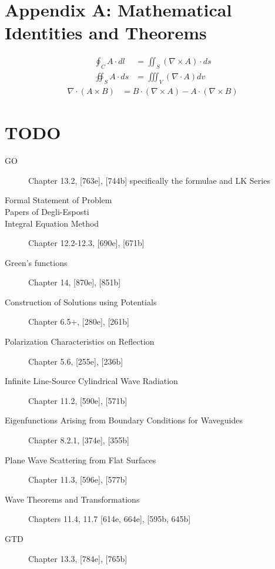 \documentclass{article}
\numberwithin{equation}{section}
\begin{document}
    \section*{Appendix A: Mathematical Identities and Theorems}
        \begin{subequations} \label{eq:integralVectorTheorems}
            \begin{align}
                \oint_C A \cdot dl &= \iint_S (\nabla \times A) \cdot ds
                    \label{eq:stokes} \\
                \oiint_S A \cdot ds &= \iiint_V (\nabla \cdot A) dv \label{eq:divergence}
            \end{align}
        \end{subequations}
        \begin{subequations} \label{eq:vectorDifferentialIdentities}
            \begin{align}
                \nabla \cdot (A \times B) &= B \cdot (\nabla \times A) - A \cdot (\nabla
                    \times B) \label{eq:divOfCurlOfProduct}
            \end{align}
        \end{subequations}
    \section*{TODO}
        \begin{description}
            \item[GO] Chapter 13.2, [763e], [744b] specifically the formulae and LK Series
            \item[Formal Statement of Problem]
            \item[Papers of Degli-Esposti]
            \item[Integral Equation Method] Chapter 12.2-12.3, [690e], [671b]
            \item[Green's functions] Chapter 14, [870e], [851b]
            \item[Construction of Solutions using Potentials] Chapter 6.5+, [280e], [261b] 
            \item[Polarization Characteristics on Reflection] Chapter 5.6, [255e], [236b] 
            \item[Infinite Line-Source Cylindrical Wave Radiation] Chapter 11.2, [590e],
                [571b] 
            \item[Eigenfunctions Arising from Boundary Conditions for Waveguides]
                Chapter 8.2.1, [374e], [355b] 
            \item[Plane Wave Scattering from Flat Surfaces] Chapter 11.3, [596e], [577b] 
            \item[Wave Theorems and Transformations] Chapters 11.4, 11.7 [614e, 664e],
                [595b, 645b] 
            \item[GTD] Chapter 13.3, [784e], [765b]
        \end{description}
\end{document}
